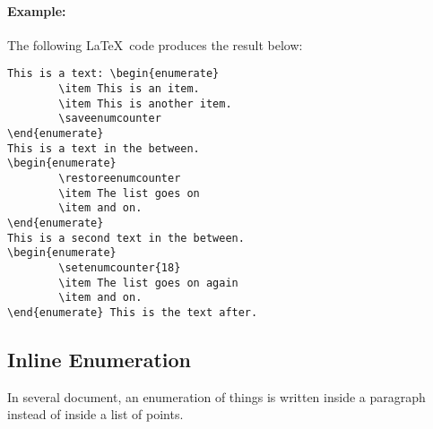\documentclass[book,taskpackage,specpackage,codepackage]{upmethodology-document}
\begin{document}
\paragraph{Example:} The following \LaTeX~code produces the result below:
\begin{verbatim}
This is a text: \begin{enumerate}
        \item This is an item.
        \item This is another item.
        \saveenumcounter
\end{enumerate}
This is a text in the between.
\begin{enumerate}
        \restoreenumcounter
        \item The list goes on
        \item and on.
\end{enumerate}
This is a second text in the between.
\begin{enumerate}
        \setenumcounter{18}
        \item The list goes on again
        \item and on.
\end{enumerate} This is the text after.
\end{verbatim}


\subsection{Inline Enumeration}

In several document, an enumeration of things is written inside a paragraph instead of inside a list of points.
\end{document}

